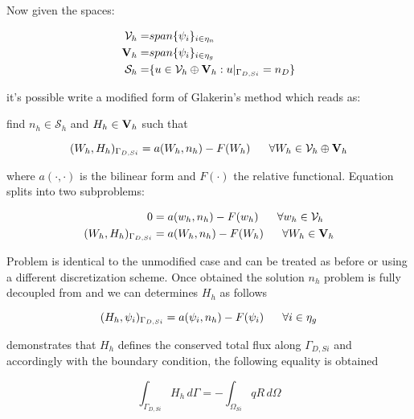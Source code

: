 Now given the spaces:

\begin{align*}
\mathcal{V}_h = & span\{\psi_i\}_{i \in \eta_n} \\
\mathbf{V}_h = & span\{\psi_i\}_{i \in \eta_g}  \\
\mathcal{S}_h = & \{u \in \mathcal{V}_h \oplus \mathbf{V}_h: u|_{\Gamma_{D,Si}} = n_D \}
\end{align*}

it's possible write a modified form of Glakerin's method which reads as: 

find $n_h  \in \mathcal{S}_h$ and $H_h \in \mathbf{V}_h$ such that

\begin{equation}
\label{eq: modified galerkin}
(W_h,H_h)_{\Gamma_{D,Si}} = a(W_h,n_h)-F(W_h) \psp{10} \forall W_h \in \mathcal{V}_h \oplus \vect{V}_h
\end{equation}

where $a(\cdot,\cdot)$ is the bilinear form  and $F(\cdot)$ the relative functional.
Equation  splits into two subproblems:

\begin{align}
0  & = a(w_h,n_h)-F(w_h) \psp{10} \forall w_h \in \mathcal{V}_h \label{eq: usual problem}\\
(W_h,H_h)_{\Gamma_{D,Si}} & = a(W_h,n_h)-F(W_h) \psp{10} \forall W_h \in \vect{V}_h \label{eq: flux problem}
\end{align}

Problem  is identical to the unmodified case and can be treated as before or using a different discretization scheme. Once obtained the solution $n_h$ problem  is fully decoupled from  and we can determines $H_h$ as follows

\begin{equation}
\label{eq: flux problem complete}
(H_h,\psi_i)_{\Gamma_{D,Si}} = a(\psi_i,n_h)-F(\psi_i) \psp{10} \forall i \in \eta_g 
\end{equation} 


\cite{GalerkMethConsHughes} demonstrates that $H_h$ defines the conserved total flux along $\Gamma_{D,Si}$ and accordingly with the boundary condition, the following equality is obtained

\begin{equation}
\label{eq: conservative flux}
\int_{\Gamma_{D,Si}} H_h \, d\Gamma = - \int_{\Omega_{Si}} qR \, d \Omega
\end{equation}


